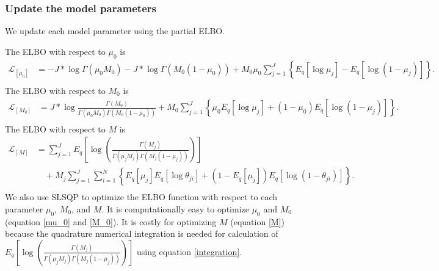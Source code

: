 \documentclass[11pt,reqno]{amsart}
\begin{document}
\subsubsection{Update the model parameters}
We update each model parameter using the partial ELBO.

The ELBO with respect to $ \mu_0 $ is
\begin{equation}
\begin{split}
\label{mu_0}
\mathcal{L}_{[\mu_0]}
&= -J*\log  \Gamma(\mu_0 M_0) - J*\log \Gamma(M_0 (1-\mu_0))
+ M_0\mu_0\sum_{j=1}^{J} \left\lbrace E_q  \left[ \log \mu_j \right]
- E_q  \left[ \log (1 - \mu_j)\right]\right\rbrace . \\
\end{split}
\end{equation}
The ELBO with respect to $ M_0 $ is
\begin{equation}
\begin{split}
\label{M_0}
\mathcal{L}_{[M_0]}
&=J* \log \frac{ \Gamma(M_0) } { \Gamma(\mu_0 M_0) \Gamma(M_0 (1-\mu_0))}
+ M_0 \sum_{j=1}^{J} \left\lbrace \mu_0E_q  \left[ \log \mu_j \right] + ( 1 - \mu_0) E_q  \left[ \log (1 - \mu_j)\right]\right\rbrace.  \\
\end{split}
\end{equation}
The ELBO with respect to $ M $ is
\begin{equation}
\begin{split}
\label{M}
\mathcal{L}_{{[M]}}
&= \sum_{j=1}^{J} E_q  \left[ \log \left( \frac{ \Gamma(M_j) } { \Gamma(\mu_j M_j) \Gamma(M_j (1-\mu_j)) }\right) \right] \\
&\quad + M_j \sum_{j=1}^{J} \sum_{i=1}^{N} \left\lbrace E_q \left[ \mu_j \right] E_q \left[ \log \theta_{ji} \right] + \left( 1 - E_q\left[ \mu_j \right]  \right) E_q\left[ \log \left( 1 - \theta_{ji}\right) \right] \right\rbrace. \\
\end{split}
\end{equation}
We also use SLSQP to optimize the ELBO function with respect to each parameter $\mu_0$, $M_0$, and $M$.
It is computationally easy to optimize $\mu_0$ and $M_0$ (equation \ref{mu_0} and \ref{M_0}).
It is costly for optimizing $M$ (equation \ref{M}) because the quadrature numerical integration is needed for calculation of $ E_q\left[ \log \left( \frac{ \Gamma(M_j) } { \Gamma(\mu_j M_j) \Gamma(M_j (1-\mu_j)) }\right)\right] $ using equation \ref{integration}.
\end{document}
